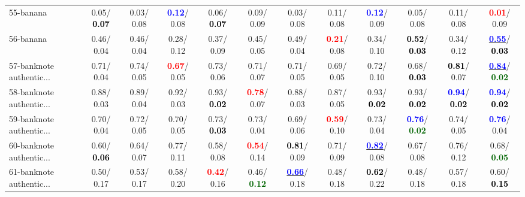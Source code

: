 \begin{table}[h]
\begin{center}
{\begin{tabular}{lc|c|c|c|c|c|c|c|c|c|c}
55-banana &   0.05/\textcolor{black}{\textbf{  0.07}} &   0.03/  0.08 & \textcolor{blue}{\textbf{  0.12}}/  0.08 &   0.06/\textcolor{black}{\textbf{  0.07}} &   0.09/  0.09 &   0.03/  0.08 &   0.11/  0.08 & \textcolor{blue}{\textbf{  0.12}}/  0.09 &   0.05/  0.08 &   0.11/  0.08 & \textcolor{red}{\textbf{  0.01}}/  0.09 \\
56-banana &   0.46/  0.04 &   0.46/  0.04 &   0.28/  0.12 &   0.37/  0.09 &   0.45/  0.05 &   0.49/  0.04 & \textcolor{red}{\textbf{  0.21}}/  0.08 &   0.34/  0.10 & \textcolor{black}{\textbf{  0.52}}/\textcolor{black}{\textbf{  0.03}} &   0.34/  0.12 & \underline{\textcolor{blue}{\textbf{  0.55}}}/\textcolor{black}{\textbf{  0.03}} \\
57-banknote authentic... &   0.71/  0.04 &   0.74/  0.05 & \textcolor{red}{\textbf{  0.67}}/  0.05 &   0.73/  0.06 &   0.71/  0.07 &   0.71/  0.05 &   0.69/  0.05 &   0.72/  0.10 &   0.68/\textcolor{black}{\textbf{  0.03}} & \textcolor{black}{\textbf{  0.81}}/  0.07 & \underline{\textcolor{blue}{\textbf{  0.84}}}/\textcolor{darkgreen}{\textbf{  0.02}} \\
58-banknote authentic... &   0.88/  0.03 &   0.89/  0.04 &   0.92/  0.03 &   0.93/\textcolor{black}{\textbf{  0.02}} & \textcolor{red}{\textbf{  0.78}}/  0.07 &   0.88/  0.03 &   0.87/  0.05 &   0.93/\textcolor{black}{\textbf{  0.02}} &   0.93/\textcolor{black}{\textbf{  0.02}} & \textcolor{blue}{\textbf{  0.94}}/\textcolor{black}{\textbf{  0.02}} & \textcolor{blue}{\textbf{  0.94}}/\textcolor{black}{\textbf{  0.02}} \\
59-banknote authentic... &   0.70/  0.04 &   0.72/  0.05 &   0.70/  0.05 &   0.73/\textcolor{black}{\textbf{  0.03}} &   0.73/  0.04 &   0.69/  0.06 & \textcolor{red}{\textbf{  0.59}}/  0.10 &   0.73/  0.04 & \textcolor{blue}{\textbf{  0.76}}/\textcolor{darkgreen}{\textbf{  0.02}} &   0.74/  0.05 & \textcolor{blue}{\textbf{  0.76}}/  0.04 \\
60-banknote authentic... &   0.60/\textcolor{black}{\textbf{  0.06}} &   0.64/  0.07 &   0.77/  0.11 &   0.58/  0.08 & \textcolor{red}{\textbf{  0.54}}/  0.14 & \textcolor{black}{\textbf{  0.81}}/  0.09 &   0.71/  0.09 & \underline{\textcolor{blue}{\textbf{  0.82}}}/  0.08 &   0.67/  0.08 &   0.76/  0.12 &   0.68/\textcolor{darkgreen}{\textbf{  0.05}} \\ \hline
61-banknote authentic... &   0.50/  0.17 &   0.53/  0.17 &   0.58/  0.20 & \textcolor{red}{\textbf{  0.42}}/  0.16 &   0.46/\textcolor{darkgreen}{\textbf{  0.12}} & \underline{\textcolor{blue}{\textbf{  0.66}}}/  0.18 &   0.48/  0.18 & \textcolor{black}{\textbf{  0.62}}/  0.22 &   0.48/  0.18 &   0.57/  0.18 &   0.60/\textcolor{black}{\textbf{  0.15}} \\

\end{tabular}}
\end{center}
\end{table}
